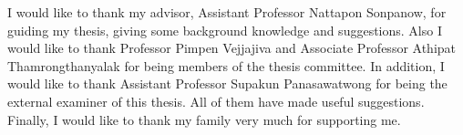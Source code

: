 \begin{acknowledgements}

I would like to thank my advisor, Assistant Professor Nattapon Sonpanow, for guiding my thesis, giving some background knowledge and suggestions. Also I would like to thank Professor Pimpen Vejjajiva and Associate Professor Athipat Thamrongthanyalak for being members of the thesis committee. In addition, I would like to thank Assistant Professor Supakun Panasawatwong for being the external examiner of this thesis. All of them have made useful suggestions. Finally, I would like to thank my family very much for supporting me. 

\end{acknowledgements}
